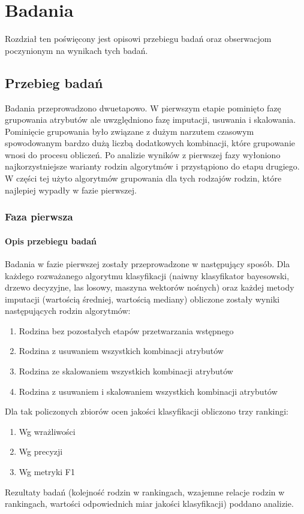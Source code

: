 \documentclass[../thesis.tex]{subfiles}
\begin{document}
\pagestyle{plain}
\chapter{Badania}

Rozdział ten poświęcony jest opisowi przebiegu badań oraz obserwacjom poczynionym na wynikach tych badań. 

\section{Przebieg badań}

Badania przeprowadzono dwuetapowo. W pierwszym etapie pominięto fazę grupowania atrybutów ale uwzględniono fazę imputacji, usuwania i skalowania. Pominięcie grupowania było związane z dużym narzutem czasowym spowodowanym bardzo dużą liczbą dodatkowych kombinacji, które grupowanie wnosi do procesu obliczeń. Po analizie wyników z pierwszej fazy wyłoniono najkorzystniejsze warianty rodzin algorytmów i przystąpiono do etapu drugiego. W części tej użyto algorytmów grupowania dla tych rodzajów rodzin, które najlepiej wypadły w fazie pierwszej.

\subsection{Faza pierwsza}

\subsubsection{Opis przebiegu badań}

Badania w fazie pierwszej zostały przeprowadzone w następujący sposób. Dla każdego rozważanego algorytmu klasyfikacji (naiwny klasyfikator bayesowski, drzewo decyzyjne, las losowy, maszyna wektorów nośnych) oraz każdej metody imputacji (wartością średniej, wartością mediany) obliczone zostały wyniki następujących rodzin algorytmów:

\begin{enumerate}
  \item Rodzina bez pozostałych etapów przetwarzania wstępnego
  \item Rodzina z usuwaniem wszystkich kombinacji atrybutów
  \item Rodzina ze skalowaniem wszystkich kombinacji atrybutów
  \item Rodzina z usuwaniem i skalowaniem wszystkich kombinacji atrybutów
\end{enumerate}
Dla tak policzonych zbiorów ocen jakości klasyfikacji obliczono trzy rankingi:
\begin{enumerate}
  \item Wg wrażliwości
  \item Wg precyzji
  \item Wg metryki F1
\end{enumerate}
Rezultaty badań (kolejność rodzin w rankingach, wzajemne relacje rodzin w rankingach, wartości odpowiednich miar jakości klasyfikacji) poddano analizie.
\end{document}
